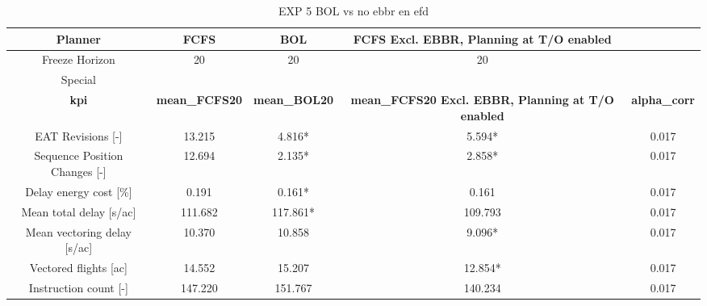 \begin{table}[htbp]
\caption{EXP 5 BOL vs no ebbr en efd}
\begin{center}
\footnotesize
\setlength{\tabcolsep}{3pt}
\renewcommand{\arraystretch}{1.000}
\begin{tabular}{|c|c|c|c|c|}
\hline
Planner & FCFS & BOL & FCFS Excl. EBBR, Planning at T/O enabled &  \\
\hline
Freeze Horizon & 20 & 20 & 20 &  \\
\hline
Special &  &  &  &  \\
\hline
\textbf{kpi} & \textbf{mean\_FCFS20} & \textbf{mean\_BOL20} & \textbf{mean\_FCFS20 Excl. EBBR, Planning at T/O enabled} & \textbf{alpha\_corr} \\
\hline
EAT Revisions [-] & 13.215 & 4.816* & 5.594* & 0.017 \\
\hline
Sequence Position Changes [-] & 12.694 & 2.135* & 2.858* & 0.017 \\
\hline
Delay energy cost [\%] & 0.191 & 0.161* & 0.161 & 0.017 \\
\hline
Mean total delay [s/ac] & 111.682 & 117.861* & 109.793 & 0.017 \\
\hline
Mean vectoring delay [s/ac] & 10.370 & 10.858 & 9.096* & 0.017 \\
\hline
Vectored flights [ac] & 14.552 & 15.207 & 12.854* & 0.017 \\
\hline
Instruction count [-] & 147.220 & 151.767 & 140.234 & 0.017 \\
\hline
\end{tabular}
\label{tab:exp\_5\_bol\_vs\_no\_ebbr\_en\_efd}
\end{center}
\end{table}